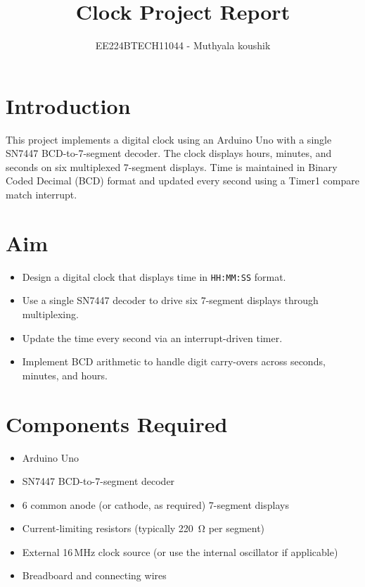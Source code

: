\documentclass{article}
\theoremstyle{remark}
\begin{document}

\vspace{3cm}

\title{Clock Project Report}
\author{EE224BTECH11044 - Muthyala koushik%
}
\date{}
\maketitle
\bigskip



\renewcommand{\thefigure}{\theenumi}
\renewcommand{\thetable}{\theenumi}



\section{Introduction}
This project implements a digital clock using an Arduino Uno with a single SN7447 BCD-to-7-segment decoder. The clock displays hours, minutes, and seconds on six multiplexed 7-segment displays. Time is maintained in Binary Coded Decimal (BCD) format and updated every second using a Timer1 compare match interrupt.

\section{Aim}
\begin{itemize}[noitemsep]
    \item Design a digital clock that displays time in \texttt{HH:MM:SS} format.
    \item Use a single SN7447 decoder to drive six 7-segment displays through multiplexing.
    \item Update the time every second via an interrupt-driven timer.
    \item Implement BCD arithmetic to handle digit carry-overs across seconds, minutes, and hours.
\end{itemize}

\section{Components Required}
\begin{itemize}[noitemsep]
    \item Arduino Uno
    \item SN7447 BCD-to-7-segment decoder
    \item 6 common anode (or cathode, as required) 7-segment displays
    \item Current-limiting resistors (typically \SI{220}{\ohm} per segment)
    \item External 16\,MHz clock source (or use the internal oscillator if applicable)
    \item Breadboard and connecting wires
\end{itemize}
\end{document}
